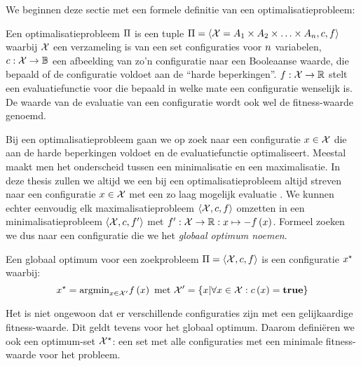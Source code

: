 We beginnen deze sectie met een formele definitie van een optimalisatieprobleem:

\begin{definition}[Optimalisatieprobleem]%
Een optimalisatieprobleem $\Pi$ is een tuple $\Pi=\left\langle \mathcal{X}=A_1\times A_2\times\ldots\times A_{n},c,f\right\rangle$ waarbij $\mathcal{X}$ een verzameling is van een set configuraties voor $n$ variabelen, $c:\mathcal{X}\rightarrow \mathbb{B}$ een afbeelding van zo'n configuratie naar een Booleaanse waarde, die bepaald of de configuratie voldoet aan de ``harde beperkingen''. $f:\mathcal{X}\rightarrow \mathbb{R}$ stelt een evaluatiefunctie voor die bepaald in welke mate een configuratie wenselijk is. De waarde van de evaluatie van een configuratie  wordt ook wel de fitness-waarde genoemd.
\end{definition}
Bij een optimalisatieprobleem gaan we op zoek naar een configuratie $x\in\mathcal{X}$ die aan de harde beperkingen voldoet en de evaluatiefunctie optimaliseert. Meestal maakt men het onderscheid tussen een minimalisatie en een maximalisatie. In deze thesis zullen we altijd we een bij een optimalisatieprobleem altijd streven naar een configuratie $x\in\mathcal{X}$ met een zo laag mogelijk evaluatie . We kunnen echter eenvoudig elk maximalisatieprobleem $\left\langle \mathcal{X},c,f\right\rangle$ omzetten in een minimalisatieprobleem $\left\langle \mathcal{X},c,f'\right\rangle$ met $f':\mathcal{X}\rightarrow \mathbb{R}:x\mapsto -f\left(x\right)$. Formeel zoeken we dus naar een configuratie \xstar{} die we het \emph{globaal optimum noemen}.

\begin{definition}
Een globaal optimum voor een zoekprobleem $\Pi=\left\langle \mathcal{X},c,f\right\rangle$ is een configuratie $x^{\star}$ waarbij:
\begin{equation}
x^{\star}=\displaystyle\mbox{argmin}_{x\in\mathcal{X}'}f\left(x\right)\mbox{ met }\mathcal{X}'=\left\{ x|\forall x\in\mathcal{X}:c\left(x\right)=\mbox{\textbf{true}}\right\}
\end{equation}
\end{definition}

Het is niet ongewoon dat er verschillende configuraties zijn met een gelijkaardige fitness-waarde. Dit geldt tevens voor het globaal optimum. Daarom defini\"eren we ook een optimum-set $\mathcal{X}^{\star}$: een set met alle configuraties met een minimale fitness-waarde voor het probleem.


